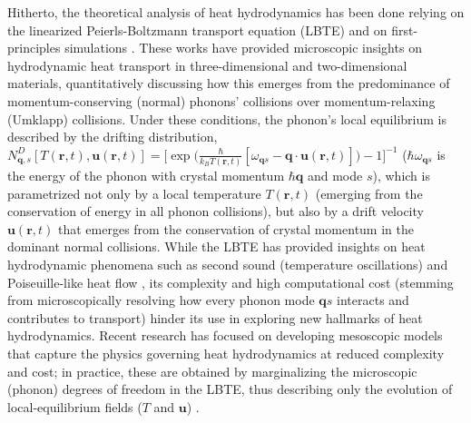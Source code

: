 \documentclass[
prb,
twocolumn,
superscriptaddress,
 amsmath,amssymb,
 aps,
longbibliography,
]{revtex4-2}
\begin{document}
Hitherto, the theoretical analysis of heat hydrodynamics has been done relying on the linearized Peierls-Boltzmann transport equation (LBTE) \cite{peierls1955quantum} and on first-principles simulations \cite{lindsay_perspective_2019,qian_phonon-engineered_2021,chen_non-fourier_2021,chaput_direct_2013,fugallo_ab_2013,app_Lee2015,cepellotti_thermal_2016}.
These works have provided microscopic insights on hydrodynamic heat transport in three-dimensional \cite{fugallo_thermal_2014,app_Ding2018,guo_size_2021,Ding2022,li_reexamination_2022,huang_mapping_2022,jiang_anisotropic_2018} and two-dimensional \cite{app_Cepellotti2015,cepellotti_thermal_2016,fugallo_thermal_2014,app_Lee2015,majee_dynamical_2018,raya-moreno_hydrodynamic_2022,guo_phonon_2021,zhang_emergence_2022,han_is_2023} materials, quantitatively discussing how this emerges from the predominance of momentum-conserving (normal) phonons' collisions over momentum-relaxing (Umklapp) collisions.
Under these conditions, the phonon's local equilibrium is described by the drifting distribution, $N^D_{\bm{q},s}[T(\bm{r},t),\bm{u}(\bm{r},t)]{=}\big[\exp\big(\tfrac{\hbar}{k_B T(\bm{r},t)}[\omega_{\bm{q}s}{-}\bm{q}{\cdot}\bm{u}(\bm{r},t)]\big){-}1\big]^{-1}$ ($\hbar\omega_{\bm{q}s}$ is the energy of the phonon with crystal momentum $\hbar\bm{q}$ and mode $s$), which is parametrized not only by a local temperature $T(\bm{r},t)$ (emerging from the conservation of energy in all phonon collisions), but also by a drift velocity $\bm{u}(\bm{r},t)$ that emerges from the conservation of crystal momentum in the dominant normal collisions.
While the LBTE has provided insights on heat hydrodynamic phenomena such as second sound (temperature oscillations) \cite{app_Cepellotti2015,Huberman2019,Ding2022} and Poiseuille-like heat flow \cite{app_Lee2015,cepellotti_boltzmann_2017,machida_observation_2018,sendra_hydrodynamic_2022,li_reexamination_2022,huang_observation_2022},
its complexity and high computational cost (stemming from microscopically resolving how every phonon mode $\bm{q}s$ interacts and contributes to transport) hinder its use in exploring new hallmarks of heat hydrodynamics.
Recent research has focused on developing mesoscopic models that capture the physics governing heat hydrodynamics at reduced complexity and cost; in practice, these are obtained by marginalizing the microscopic (phonon) degrees of freedom in the LBTE, thus describing only the evolution of local-equilibrium fields ($T$ and $\bm{u}$) \cite{li_role_2018,guo_nonequilibrium_2018,shang_heat_2020,Simoncelli2020,sendra_derivation_2021}.
\end{document}
